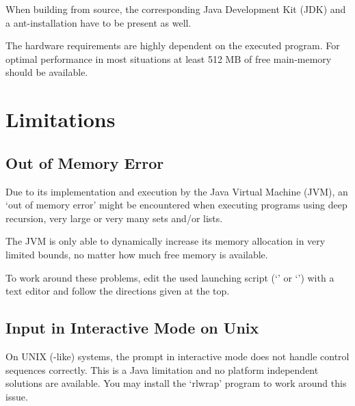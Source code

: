 When building from source, the corresponding Java Development Kit (JDK) and a ant-installation have to be present as well.

The hardware requirements are highly dependent on the executed \SetlX{} program. For optimal performance in most situations at least 512 MB of free main-memory should be available.

\section{Limitations}

\subsection{Out of Memory Error}

Due to its implementation and execution by the Java Virtual Machine (JVM), an `out of memory error' might be encountered when executing \SetlX{} programs using deep recursion, very large or very many sets and\slash{}or lists.

The JVM is only able to dynamically increase its memory allocation in very limited bounds, no matter how much free memory is available.

To work around these problems, edit the used launching script (`' or `') with a text editor and follow the directions given at the top.

%

\subsection{Input in Interactive Mode on Unix}

On UNIX (-like) systems, the prompt in interactive mode does not handle control sequences correctly. This is a Java limitation and no platform independent solutions are available. You may install the `rlwrap' program to work around this issue.

%

